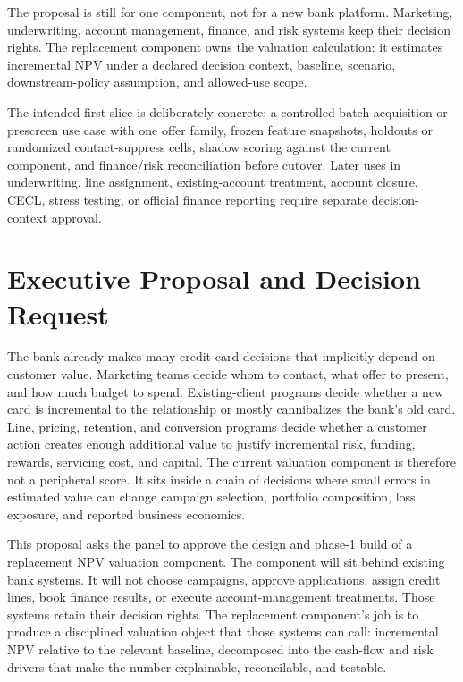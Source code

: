 \documentclass[11pt]{article}
\newcommand{\1}{\mathbf{1}}
\begin{document}
The proposal is still for one component, not for a new bank platform.  Marketing,
underwriting, account management, finance, and risk systems keep their decision
rights.  The replacement component owns the valuation calculation: it estimates
incremental NPV under a declared decision context, baseline, scenario,
downstream-policy assumption, and allowed-use scope.

The intended first slice is deliberately concrete: a controlled batch
acquisition or prescreen use case with one offer family, frozen feature
snapshots, holdouts or randomized contact-suppress cells, shadow scoring against
the current component, and finance/risk reconciliation before cutover. Later
uses in underwriting, line assignment, existing-account treatment, account
closure, CECL, stress testing, or official finance reporting require separate
decision-context approval.

\tableofcontents
\clearpage

\section{Executive Proposal and Decision Request}
\label{sec:executive-charter}

The bank already makes many credit-card decisions that implicitly depend on
customer value. Marketing teams decide whom to contact, what offer to present,
and how much budget to spend. Existing-client programs decide whether a new
card is incremental to the relationship or mostly cannibalizes the bank's old
card. Line, pricing, retention, and conversion programs decide whether a
customer action creates enough additional value to justify incremental risk,
funding, rewards, servicing cost, and capital. The current valuation component
is therefore not a peripheral score. It sits inside a chain of decisions where
small errors in estimated value can change campaign selection, portfolio
composition, loss exposure, and reported business economics.

This proposal asks the panel to approve the design and phase-1 build of a
replacement NPV valuation component. The component will sit behind existing
bank systems. It will not choose campaigns, approve applications, assign credit
lines, book finance results, or execute account-management treatments. Those
systems retain their decision rights. The replacement component's job is to
produce a disciplined valuation object that those systems can call: incremental
NPV relative to the relevant baseline, decomposed into the cash-flow and risk
drivers that make the number explainable, reconcilable, and testable.
\end{document}
